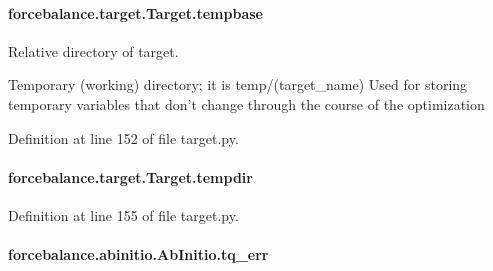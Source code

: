\hypertarget{classforcebalance_1_1target_1_1Target_ae5b544d3e11365865813ef3d626ef81d}{
\paragraph[{tempbase}]{\setlength{\rightskip}{0pt plus 5cm}forcebalance.\-target.\-Target.\-tempbase\hspace{0.3cm}{\ttfamily [inherited]}}}\label{classforcebalance_1_1target_1_1Target_ae5b544d3e11365865813ef3d626ef81d}


Relative directory of target. 

Temporary (working) directory; it is temp/(target\-\_\-name) Used for storing temporary variables that don't change through the course of the optimization 

Definition at line 152 of file target.\-py.

\hypertarget{classforcebalance_1_1target_1_1Target_aa1f01b5b78db253b5b66384ed11ed193}{
\paragraph[{tempdir}]{\setlength{\rightskip}{0pt plus 5cm}forcebalance.\-target.\-Target.\-tempdir\hspace{0.3cm}{\ttfamily [inherited]}}}\label{classforcebalance_1_1target_1_1Target_aa1f01b5b78db253b5b66384ed11ed193}


Definition at line 155 of file target.\-py.

\hypertarget{classforcebalance_1_1abinitio_1_1AbInitio_ae60e834d5b5bf13f8fb70d403a97db28}{
\paragraph[{tq\-\_\-err}]{\setlength{\rightskip}{0pt plus 5cm}forcebalance.\-abinitio.\-Ab\-Initio.\-tq\-\_\-err}}\label{classforcebalance_1_1abinitio_1_1AbInitio_ae60e834d5b5bf13f8fb70d403a97db28}


